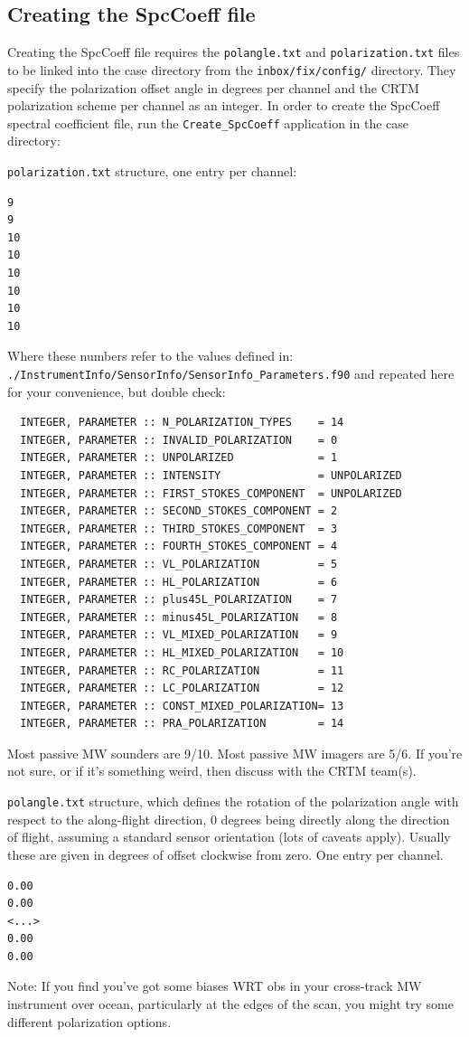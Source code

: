 \subsection{Creating the SpcCoeff file}
Creating the SpcCoeff file requires the \verb|polangle.txt| and \verb|polarization.txt| files to be linked into the case directory from the \verb|inbox/fix/config/| directory.
They specify the polarization offset angle in degrees per channel and the CRTM polarization scheme per channel as an integer.
In order to create the SpcCoeff spectral coefficient file, run the \verb|Create_SpcCoeff| application in the case directory:

\verb|polarization.txt| structure, one entry per channel:
\begin{verbatim}
9
9
10
10
10
10
10
10
\end{verbatim}
Where these numbers refer to the values defined in:
\verb|./InstrumentInfo/SensorInfo/SensorInfo_Parameters.f90|
and repeated here for your convenience, but double check:
\begin{verbatim}
  INTEGER, PARAMETER :: N_POLARIZATION_TYPES    = 14
  INTEGER, PARAMETER :: INVALID_POLARIZATION    = 0
  INTEGER, PARAMETER :: UNPOLARIZED             = 1
  INTEGER, PARAMETER :: INTENSITY               = UNPOLARIZED
  INTEGER, PARAMETER :: FIRST_STOKES_COMPONENT  = UNPOLARIZED
  INTEGER, PARAMETER :: SECOND_STOKES_COMPONENT = 2
  INTEGER, PARAMETER :: THIRD_STOKES_COMPONENT  = 3
  INTEGER, PARAMETER :: FOURTH_STOKES_COMPONENT = 4
  INTEGER, PARAMETER :: VL_POLARIZATION         = 5
  INTEGER, PARAMETER :: HL_POLARIZATION         = 6
  INTEGER, PARAMETER :: plus45L_POLARIZATION    = 7
  INTEGER, PARAMETER :: minus45L_POLARIZATION   = 8
  INTEGER, PARAMETER :: VL_MIXED_POLARIZATION   = 9
  INTEGER, PARAMETER :: HL_MIXED_POLARIZATION   = 10
  INTEGER, PARAMETER :: RC_POLARIZATION         = 11
  INTEGER, PARAMETER :: LC_POLARIZATION         = 12
  INTEGER, PARAMETER :: CONST_MIXED_POLARIZATION= 13
  INTEGER, PARAMETER :: PRA_POLARIZATION        = 14
\end{verbatim}
Most passive MW sounders are 9/10.   Most passive MW imagers are 5/6.   If you're not sure, or if it's something weird, then discuss with the CRTM team(s).   

\verb|polangle.txt| structure, which defines the rotation of the polarization angle with respect to the along-flight direction, 0 degrees being directly along the direction of flight, assuming a standard sensor orientation (lots of caveats apply).  Usually these are given in degrees of offset clockwise from zero.   One entry per channel. 
\begin{verbatim}
0.00
0.00
<...> 
0.00
0.00
\end{verbatim}
Note: If you find you've got some biases WRT obs in your cross-track MW instrument over ocean, particularly at the edges of the scan, you might try some different polarization options. 

